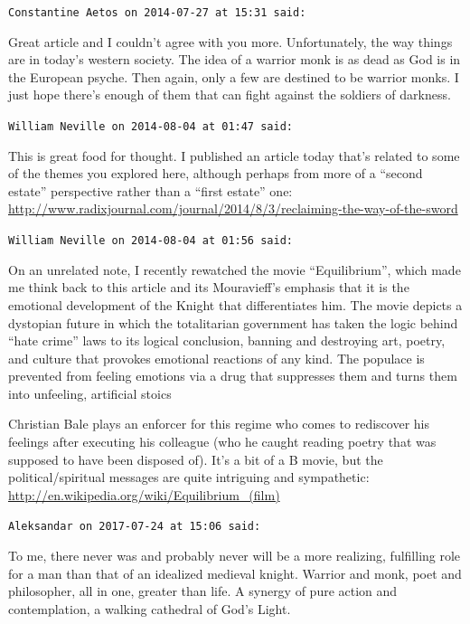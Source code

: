 \begin{footnotesize}
\begin{sffamily}
\texttt{Constantine Aetos on 2014-07-27 at 15:31 said:}

Great article and I couldn't agree with you more. Unfortunately, the way things are in today's western society. The idea of a warrior monk is as dead as God is in the European psyche. Then again, only a few are destined to be warrior monks. I just hope there's enough of them that can fight against the soldiers of darkness.

\hfill

\texttt{William Neville on 2014-08-04 at 01:47 said:}

This is great food for thought. I published an article today that's related to some of the themes you explored here, although perhaps from more of a ``second estate'' perspective rather than a ``first estate'' one:
\url{http://www.radixjournal.com/journal/2014/8/3/reclaiming-the-way-of-the-sword}


\hfill

\texttt{William Neville on 2014-08-04 at 01:56 said:}

On an unrelated note, I recently rewatched the movie ``Equilibrium'', which made me think back to this article and its Mouravieff's emphasis that it is the emotional development of the Knight that differentiates him. The movie depicts a dystopian future in which the totalitarian government has taken the logic behind ``hate crime'' laws to its logical conclusion, banning and destroying art, poetry, and culture that provokes emotional reactions of any kind. The populace is prevented from feeling emotions via a drug that suppresses them and turns them into unfeeling, artificial stoics

Christian Bale plays an enforcer for this regime who comes to rediscover his feelings after executing his colleague (who he caught reading poetry that was supposed to have been disposed of). It's a bit of a B movie, but the political/spiritual messages are quite intriguing and sympathetic: \url{http://en.wikipedia.org/wiki/Equilibrium\_(film)}

\hfill

\texttt{Aleksandar on 2017-07-24 at 15:06 said:}

To me, there never was and probably never will be a more realizing, fulfilling role for a man than that of an idealized medieval knight. Warrior and monk, poet and philosopher, all in one, greater than life. A synergy of pure action and contemplation, a walking cathedral of God's Light.


\hfill

\end{sffamily}
\end{footnotesize}

